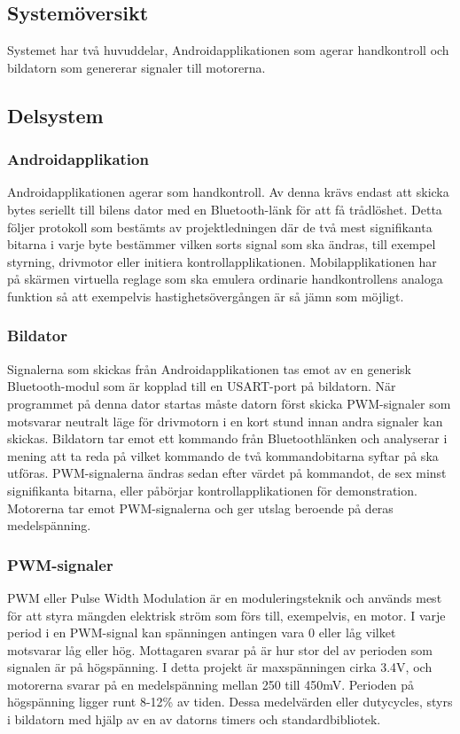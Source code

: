 \documentclass[a4paper]{article}
\begin{document}
\subsection{Systemöversikt}
Systemet har två huvuddelar, Androidapplikationen som agerar handkontroll och bildatorn som genererar signaler till motorerna.



\subsection{Delsystem}
\subsubsection{Androidapplikation}
Androidapplikationen agerar som handkontroll. Av denna krävs endast att skicka bytes seriellt till bilens dator med en Bluetooth-länk för att få trådlöshet. Detta följer protokoll som bestämts av projektledningen där de två mest signifikanta bitarna i varje byte bestämmer vilken sorts signal som ska ändras, till exempel styrning, drivmotor eller initiera kontrollapplikationen. Mobilapplikationen har på skärmen virtuella reglage som ska emulera ordinarie handkontrollens analoga funktion så att exempelvis hastighetsövergången är så jämn som möjligt. 

\subsubsection{Bildator}
Signalerna som skickas från Androidapplikationen tas emot av en generisk Bluetooth-modul som är kopplad till en USART-port på bildatorn. När programmet på denna dator startas måste datorn först skicka PWM-signaler som motsvarar neutralt läge för drivmotorn i en kort stund innan andra signaler kan skickas. Bildatorn tar emot ett kommando från Bluetoothlänken och analyserar i mening att ta reda på vilket kommando de två kommandobitarna syftar på ska utföras. PWM-signalerna ändras sedan efter värdet på kommandot, de sex minst signifikanta bitarna, eller påbörjar kontrollapplikationen för demonstration. Motorerna tar emot PWM-signalerna och ger utslag beroende på deras medelspänning.

\subsubsection{PWM-signaler}
PWM eller Pulse Width Modulation är en moduleringsteknik och används mest för att styra mängden elektrisk ström som förs till, exempelvis, en motor. I varje period i en PWM-signal kan spänningen antingen vara 0 eller låg vilket motsvarar låg eller hög. Mottagaren svarar på är hur stor del av perioden som signalen är på högspänning. I detta projekt är maxspänningen cirka 3.4V, och motorerna svarar på en medelspänning mellan 250 till 450mV. Perioden på högspänning ligger runt 8-12\% av tiden. Dessa medelvärden eller dutycycles, styrs i bildatorn med hjälp av en av datorns timers och standardbibliotek.
\end{document}
